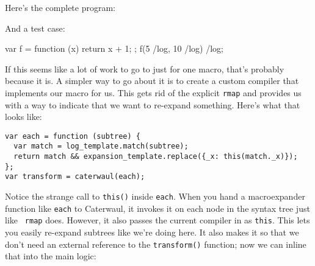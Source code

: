 \documentclass{report}
\begin{document}
    Here's the complete program:


    And a test case:

\begin{resourcecode}
var f = function (x) {
  return x + 1;
};
f(5 /log, 10 /log) /log; \end{resourcecode}

    If this seems like a lot of work to go to just for one macro, that's probably because it is. A simpler way to go about it is to create a custom compiler that implements our macro for us.
    This gets rid of the explicit {\tt rmap} and provides us with a way to indicate that we want to re-expand something. Here's what that looks like:

\begin{verbatim}
var each = function (subtree) {
  var match = log_template.match(subtree);
  return match && expansion_template.replace({_x: this(match._x)});
};
var transform = caterwaul(each);
\end{verbatim}

    Notice the strange call to {\tt this()} inside {\tt each}. When you hand a macroexpander function like {\tt each} to Caterwaul, it invokes it on each node in the syntax tree just like {\tt
    rmap} does. However, it also passes the current compiler in as {\tt this}. This lets you easily re-expand subtrees like we're doing here. It also makes it so that we don't need an external
    reference to the {\tt transform()} function; now we can inline that into the main logic:
\end{document}
